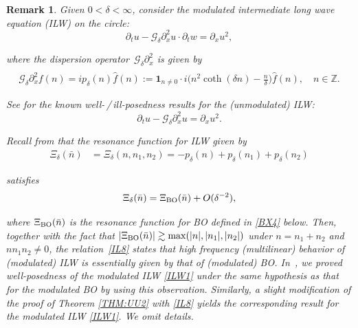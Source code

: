 \documentclass[letterpaper, 11pt,  reqno]{amsart}
\newtheorem{remark}[theorem]{Remark}
\newcommand{\1}{\hspace{0.5mm}\text{I}\hspace{0.5mm}}
\newcommand{\noi}{\noindent}
\newcommand{\Z}{\mathbb{Z}}
\newcommand{\dl}{\delta}
\newcommand{\ft}{\widehat}
\newcommand{\dx}{\partial_x}
\newcommand{\dt}{\partial_t}
\newcommand{\Gdl}{\mathcal{G}_{\dl} }
\newcommand{\ges}{\gtrsim}
\newcommand{\ind}{\mathbf 1}
\newcommand{\BO}{\text{\rm BO} }
\numberwithin{equation}{section}
\numberwithin{theorem}{section}
\begin{document}
\begin{remark}\rm
Given $0 < \dl < \infty$, 
 consider the 
modulated 
intermediate long wave equation (ILW) on the circle: 
\begin{equation}
\label{ILW1}
\dt u-    \Gdl\dx^2 u \cdot \dt w =\dx u^2, 
\end{equation}

\noi
where the dispersion operator~$\Gdl \dx^2$ is given 
by 
\begin{align*}
\ft{\Gdl \dx^2 f}(n) =
i p_\dl(n)  \ft f(n)
:=
 \ind_{n\ne 0}\cdot i \bigg(n^2 \coth(\dl n)  - \frac{n}{\dl }\bigg) \ft{f}(n), \quad n\in\Z.
\end{align*}

\noi
See
\cite{S19, Li24, LOZ, CLOP, CFLOP, FLZ, CLO}
for the known well-\,/\,ill-posedness
results
for the (unmodulated) ILW:
\begin{equation*}
\dt u-    \Gdl\dx^2 u  =\dx u^2.
\end{equation*}


Recall from  \cite[(5.22)]{CGLLO1}
that  the resonance function for ILW 
given by 
\begin{align*}
\Xi_\dl (\bar n)
& = \Xi_\dl(n,n_1,n_2) = - p_\dl(n)  +   p_\dl(n_1) +  p_\dl(n_2)
\end{align*}



\noi
satisfies 
\begin{align}
\Xi_\dl(\bar n) =  \Xi_\BO(\bar n) + O(\dl^{-2}), 
\label{IL8}
\end{align}

\noi
where
$\Xi_\BO(\bar n) $
is the resonance function for BO
defined in \eqref{BX4} below.
Then, together with the fact that 
$|\Xi_\BO(\bar n)| \ges \max(|n|, |n_1|, |n_2|)$
under $n = n_1 + n_2$ and $n n_1 n_2 \ne 0$, 
the relation~\eqref{IL8}
states
that high frequency (multilinear) behavior
of (modulated) ILW is essentially given by that of 
(modulated) 
BO.
In~\cite{CGLLO1}, 
we proved well-posedness
of the modulated ILW \eqref{ILW1}
under the same hypothesis as that for the modulated BO
by using this observation.
Similarly, 
 a slight modification of the proof
of Theorem \ref{THM:UU2}
 with \eqref{IL8}
yields the corresponding result
for the modulated ILW \eqref{ILW1}.
We omit details.






\end{remark}
\end{document}
